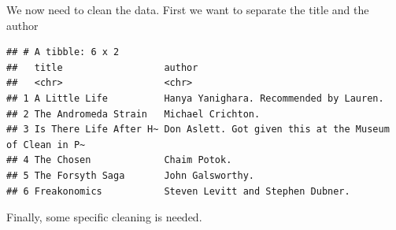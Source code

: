\documentclass[
]{book}
\newenvironment{Shaded}{\begin{snugshade}}{\end{snugshade}}
\newcommand{\CommentTok}[1]{\textcolor[rgb]{0.56,0.35,0.01}{\textit{#1}}}
\newcommand{\DataTypeTok}[1]{\textcolor[rgb]{0.13,0.29,0.53}{#1}}
\newcommand{\KeywordTok}[1]{\textcolor[rgb]{0.13,0.29,0.53}{\textbf{#1}}}
\newcommand{\NormalTok}[1]{#1}
\newcommand{\OperatorTok}[1]{\textcolor[rgb]{0.81,0.36,0.00}{\textbf{#1}}}
\newcommand{\StringTok}[1]{\textcolor[rgb]{0.31,0.60,0.02}{#1}}
\begin{document}
We now need to clean the data. First we want to separate the title and the author

\begin{Shaded}
\end{Shaded}

\begin{verbatim}
## # A tibble: 6 x 2
##   title                  author                                                 
##   <chr>                  <chr>                                                  
## 1 A Little Life          Hanya Yanighara. Recommended by Lauren.                
## 2 The Andromeda Strain   Michael Crichton.                                      
## 3 Is There Life After H~ Don Aslett. Got given this at the Museum of Clean in P~
## 4 The Chosen             Chaim Potok.                                           
## 5 The Forsyth Saga       John Galsworthy.                                       
## 6 Freakonomics           Steven Levitt and Stephen Dubner.
\end{verbatim}

Finally, some specific cleaning is needed.
\end{document}
